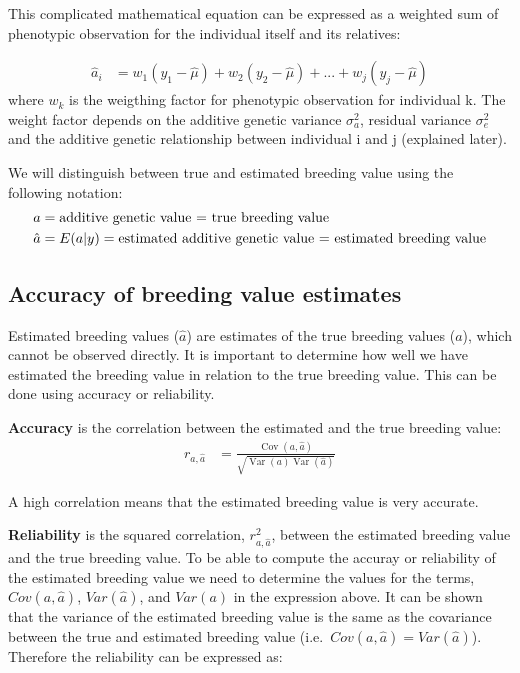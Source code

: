 \documentclass[
]{article}
\DeclareMathOperator{\Var}{Var}
\DeclareMathOperator{\Cov}{Cov}
\begin{document}
This complicated mathematical equation can be expressed as a weighted sum of phenotypic observation for the individual itself and its relatives:

\begin{align}
\hat{a}_i &= w_1(y_1-\hat{\mu})+w_2(y_2-\hat{\mu})+ ...+ w_j(y_j-\hat{\mu})
\end{align}
where \(w_k\) is the weigthing factor for phenotypic observation for individual k. The weight factor depends on the additive genetic variance \(\sigma^2_{a}\), residual variance \(\sigma^2_{e}\) and the additive genetic relationship between individual i and j (explained later).

We will distinguish between true and estimated breeding value using the following notation:
\begin{align}
a &= \text{additive genetic value = true breeding value} \notag \\
\hat{a} &= E(a|y) = \text{estimated additive genetic value = estimated breeding value} \notag
\end{align}

\subsection{Accuracy of breeding value estimates}\label{accuracy-of-breeding-value-estimates}

Estimated breeding values (\(\hat{a}\)) are estimates of the true breeding values (\(a\)), which cannot be observed directly. It is important to determine how well we have estimated the breeding value in relation to the true breeding value. This can be done using accuracy or reliability.

\textbf{Accuracy} is the correlation between the estimated and the true breeding value:
\begin{align}
            r_{a,\hat{a}} &= \frac{\Cov(a,\hat{a})}{\sqrt{\Var(a) \Var(\hat{a})}}
\end{align}

A high correlation means that the estimated breeding value is very accurate.

\textbf{Reliability} is the squared correlation, \(r_{a,\hat{a}}^2\), between the estimated breeding value and the true breeding value. To be able to compute the accuray or reliability of the estimated breeding value we need to determine the values for the terms, \(Cov(a,\hat{a})\), \(Var(\hat{a})\), and \(Var(a)\) in the expression above. It can be shown that the variance of the estimated breeding value is the same as the covariance between the true and estimated breeding value (i.e.~\(Cov(a,\hat{a}) = Var(\hat{a})\)). Therefore the reliability can be expressed as:
\end{document}
